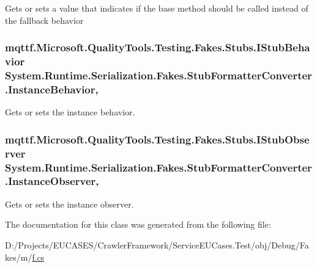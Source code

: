 Gets or sets a value that indicates if the base method should be called instead of the fallback behavior

\hypertarget{class_system_1_1_runtime_1_1_serialization_1_1_fakes_1_1_stub_formatter_converter_a93d4ac7c2eae7a76191b16f2720ca0cd}{
\subsubsection[{Instance\-Behavior}]{\setlength{\rightskip}{0pt plus 5cm}mqttf.\-Microsoft.\-Quality\-Tools.\-Testing.\-Fakes.\-Stubs.\-I\-Stub\-Behavior System.\-Runtime.\-Serialization.\-Fakes.\-Stub\-Formatter\-Converter.\-Instance\-Behavior\hspace{0.3cm}{\ttfamily [get]}, {\ttfamily [set]}}}\label{class_system_1_1_runtime_1_1_serialization_1_1_fakes_1_1_stub_formatter_converter_a93d4ac7c2eae7a76191b16f2720ca0cd}


Gets or sets the instance behavior.

\hypertarget{class_system_1_1_runtime_1_1_serialization_1_1_fakes_1_1_stub_formatter_converter_a8f78bde6c5dd708848ea8607ac89ea65}{
\subsubsection[{Instance\-Observer}]{\setlength{\rightskip}{0pt plus 5cm}mqttf.\-Microsoft.\-Quality\-Tools.\-Testing.\-Fakes.\-Stubs.\-I\-Stub\-Observer System.\-Runtime.\-Serialization.\-Fakes.\-Stub\-Formatter\-Converter.\-Instance\-Observer\hspace{0.3cm}{\ttfamily [get]}, {\ttfamily [set]}}}\label{class_system_1_1_runtime_1_1_serialization_1_1_fakes_1_1_stub_formatter_converter_a8f78bde6c5dd708848ea8607ac89ea65}


Gets or sets the instance observer.



The documentation for this class was generated from the following file\-:\begin{DoxyCompactItemize}
\item 
D\-:/\-Projects/\-E\-U\-C\-A\-S\-E\-S/\-Crawler\-Framework/\-Service\-E\-U\-Cases.\-Test/obj/\-Debug/\-Fakes/m/\hyperlink{m_2f_8cs}{f.\-cs}\end{DoxyCompactItemize}
